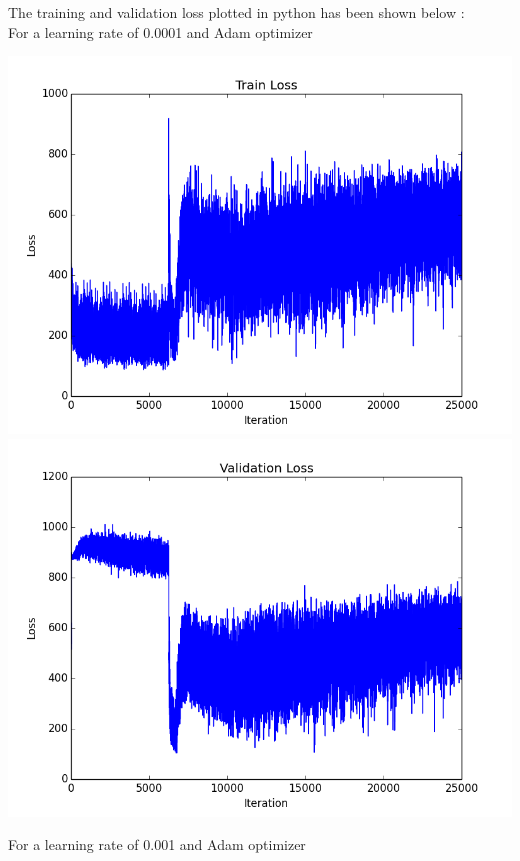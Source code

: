 \documentclass[12pt]{report}
\begin{document}
The training and validation loss plotted in python has been shown below :
\\For a learning rate of 0.0001 and Adam optimizer
\begin{center}
\includegraphics[scale=0.5]{train_loss1.png} \\
\vspace{3mm}
\includegraphics[scale=0.5]{val_loss1.png} 
\end{center}
For a learning rate of 0.001 and Adam optimizer
\end{document}
